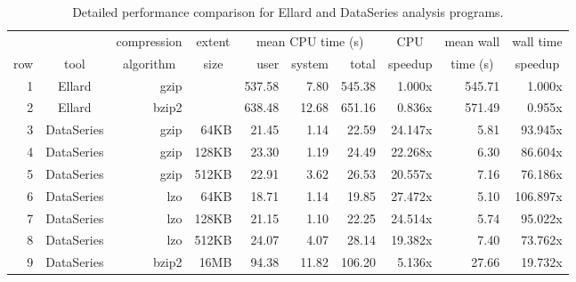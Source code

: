 \documentclass{acm_proc_article-sp}
\begin{document}

\begin{table*}
\centering
\caption{
Detailed performance comparison for Ellard and DataSeries analysis programs.}
\begin{tabular}{|r||c|r|r|r|r|r|r|r|r|} \hline
 &  & \multicolumn{1}{c|}{compression} & \multicolumn{1}{c|}{extent}  & \multicolumn{3}{c|}{mean CPU time (s)}     & \multicolumn{1}{c|}{CPU}     & \multicolumn{1}{c|}{mean wall}    & \multicolumn{1}{c|}{wall time} \\ \cline{4-6}
row & tool & \multicolumn{1}{c|}{algorithm} & \multicolumn{1}{c|}{size}  & user & system & total  & \multicolumn{1}{c|}{speedup} & \multicolumn{1}{c|}{time (s)} & \multicolumn{1}{c|}{speedup}  \\ \hline
1 &Ellard & gzip &  & 537.58    &  7.80     & 545.38   &  1.000x & 545.71   &   1.000x \\
2 & Ellard & bzip2 & & 638.48    & 12.68     & 651.16   &  0.836x & 571.49   &   0.955x \\
\hline
3 & DataSeries & gzip & 64KB   &  21.45    &  1.14     &  22.59   & 24.147x &   5.81   &  93.945x \\
4 & DataSeries & gzip & 128KB  &  23.30    &  1.19     &  24.49   & 22.268x &   6.30   &  86.604x \\
5 & DataSeries & gzip & 512KB  &  22.91    &  3.62     &  26.53   & 20.557x &   7.16   &  76.186x \\
\hline
6 & DataSeries & lzo & 64KB  &  18.71    &  1.14     &  19.85   & 27.472x &   5.10   & 106.897x \\
7 & DataSeries & lzo &128KB &  21.15    &  1.10     &  22.25   & 24.514x &   5.74   &  95.022x \\
8 & DataSeries & lzo &512KB &  24.07    &  4.07     &  28.14   & 19.382x &   7.40   &  73.762x \\ \hline
9 & DataSeries & bzip2 &16MB  &  94.38    & 11.82     & 106.20   &  5.136x &  27.66   &  19.732x \\
\hline
\end{tabular}

\label{tab:summary}
\end{table*}
\end{document}
